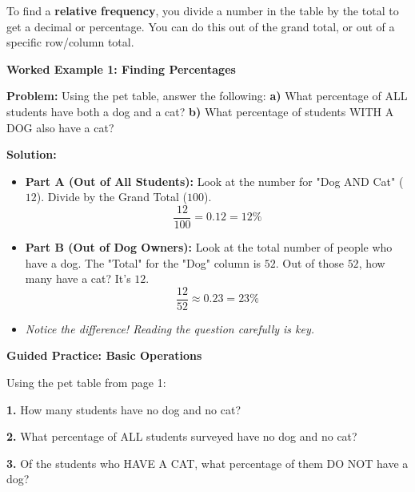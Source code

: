 \documentclass[12pt, letterpaper, fleqn]{article}
\begin{document}
\noindent
To find a \textbf{relative frequency}, you divide a number in the table by the total to get a decimal or percentage. You can do this out of the grand total, or out of a specific row/column total.

\vspace{3mm}

\begin{tcolorbox}[colback=white, colframe=black!25, boxrule=0.6pt, arc=4mm, left=6mm, right=6mm, top=5mm, bottom=5mm]

\textbf{Worked Example 1: Finding Percentages}

\medskip

\textbf{Problem:} Using the pet table, answer the following:
\textbf{a)} What percentage of ALL students have both a dog and a cat?
\textbf{b)} What percentage of students WITH A DOG also have a cat?

\medskip

\textbf{Solution:}
\begin{itemize}
    \item \textbf{Part A (Out of All Students):} Look at the number for "Dog AND Cat" ($12$). Divide by the Grand Total ($100$). 
    \[ \frac{12}{100} = 0.12 = 12\% \]
    \item \textbf{Part B (Out of Dog Owners):} Look at the total number of people who have a dog. The "Total" for the "Dog" column is $52$. Out of those $52$, how many have a cat? It's $12$.
    \[ \frac{12}{52} \approx 0.23 = 23\% \]
    \item \textit{Notice the difference! Reading the question carefully is key.}
\end{itemize}

\end{tcolorbox}

\vspace{4mm}

\begin{tcolorbox}[colback=white!15, colframe=black, boxrule=1.5pt, arc=4mm, left=6mm, right=6mm, top=5mm, bottom=5mm]

\textbf{Guided Practice: Basic Operations}

\medskip

Using the pet table from page 1:
\vspace{2mm}

\noindent
\textbf{1.} How many students have no dog and no cat?
\vspace{1.5cm}

\noindent
\textbf{2.} What percentage of ALL students surveyed have no dog and no cat?
\vspace{1.5cm}

\noindent
\textbf{3.} Of the students who HAVE A CAT, what percentage of them DO NOT have a dog?
\vspace{2.5cm}

\end{tcolorbox}
\end{document}
